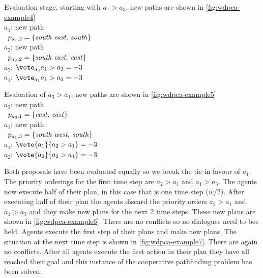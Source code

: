 Evaluation stage, starting with $a_1 > a_3$, new paths are shown in 
\autoref{fig:wdpca-example4}
\\ \-\qquad $a_1$: new path
\\ \-\qquad\quad\,\; $p_{a_1,2} = \{\text{\emph{south east, south}}\}$
\\ \-\qquad $a_2$: new path
\\ \-\qquad\quad\,\; $p_{a_3,2} = \{\text{\emph{south east, east}}\}$
\\ \-\qquad $a_2$: $\vote_{a_3}{a_1 > a_3} = -3$
\\ \-\qquad $a_1$: $\vote_{a_1}{a_1 > a_3} = -3$

Evaluation of $a_3 > a_1$, new paths are shown in \autoref{fig:wdpca-example5}
\\ \-\qquad $a_3$: new path
\\ \-\qquad\quad\,\; $p_{a_3,1} = \{\text{\emph{east, east}}\}$
\\ \-\qquad $a_1$: new path
\\ \-\qquad\quad\,\; $p_{a_1,3} = \{\text{\emph{south west, south}}\}$
\\ \-\qquad $a_1$: $\vote{a_1}{a_2 > a_1} = -3$
\\ \-\qquad $a_2$: $\vote{a_2}{a_2 > a_1} = -3$

Both proposals have been evaluated equally so we break the tie in favour of 
$a_1$. The priority orderings for the first time step are $a_2 > a_1$ and $a_1 
> a_3$. The agents now execute half of their plan, in this case that is one 
time step ($w/2$). After executing half of their plan the agents discard the 
priority orders $a_2 > a_1$ and $a_1 > a_3$ and they make new plans for the 
next 2 time steps. These new plans are shown in \autoref{fig:wdpca-example6}. 
There are no conflicts so no dialogues need to bee held. Agents execute the 
first step of their plans and make new plans. The situation at the next time 
step is shown in \autoref{fig:wdpca-example7}. There are again no conflicts. 
After all agents execute the first action in their plan they have all reached 
their goal and this instance of the cooperative pathfinding problem has been 
solved.

